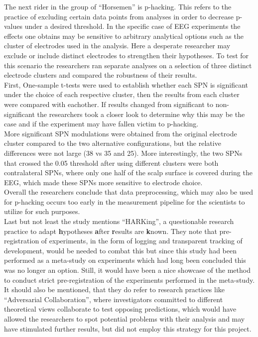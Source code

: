 \documentclass{article}
\begin{document}
The next rider in the group of ``Horsemen'' is p-hacking. This refers to the practice of excluding certain data points from analyses in order to decrease p-values under a desired threshold. In the specific case of EEG experiments the effects one obtains may be sensitive to arbitrary analytical options such as the cluster of electrodes used in the analysis. Here a desperate researcher may exclude or include distinct electrodes to strengthen their hypotheses. To test for this scenario the researchers ran separate analyses on a selection of three distinct electrode clusters and compared the robustness of their results. \\
First, One-sample t-tests were used to establish whether each SPN is significant under the choice of each respective cluster, then the results from each cluster were compared with eachother. If results changed from significant to non-significant the researchers took a closer look to determine why this may be the case and if the experiment may have fallen victim to p-hacking.\\
More significant SPN modulations were obtained from the original electrode cluster compared to the two alternative configurations, but the relative differences were not large (38 vs 35 and 25). More interestingly, the two SPNs that crossed the 0.05 threshold after using different clusters were both contralateral SPNs, where only one half of the scalp surface is covered during the EEG, which made these SPNs more sensitive to electrode choice.\\
Overall the researchers conclude that data preprocessing, which may also be used for p-hacking occurs too early in the measurement pipeline for the scientists to utilize for such purposes. \\

Last but not least the study mentions ``HARKing'', a questionable research practice to adapt \textbf{h}ypotheses \textbf{a}fter \textbf{r}esults are \textbf{k}nown. They note that pre-registration of experiments, in the form of logging and transparent tracking of development, would be needed to combat this but since this study had been performed as a meta-study on experiments which had long been concluded this was no longer an option. Still, it would have been a nice showcase of the method to conduct strict pre-registration of the experiments performed in the meta-study. It should also be mentioned, that they do refer to research practices like ``Adversarial Collaboration'', where investigators committed to different theoretical views collaborate to test opposing predictions, which would have allowed the researchers to spot potential problems with their analysis and may have stimulated further results, but did not employ this strategy for this project. 
\end{document}
